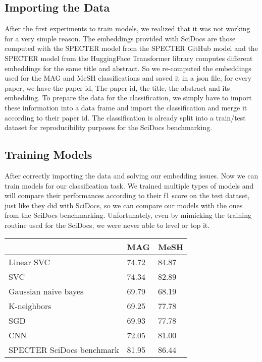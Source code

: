 \documentclass[conference]{IEEEtran}
\begin{document}
\subsection{Importing the Data}

After the first experiments to train models, we realized that it was not working for a very simple reason. The embeddings provided with SciDocs are those computed with the SPECTER model from the SPECTER GitHub model and the SPECTER model from the HuggingFace Transformer library computes different embeddings for the same title and abstract. So we re-computed the embeddings used for the MAG and MeSH classifications and saved it in a json file, for every paper, we have the paper id, The paper id, the title, the abstract and its embedding. To prepare the data for the classification, we simply have to import these information into a data frame and import the classification and merge it according to their paper id. The classification is already split into a train/test dataset for reproducibility purposes for the SciDocs benchmarking.

\subsection{Training Models}

After correctly importing the data and solving our embedding issues. Now we can train models for our classification task. We trained multiple types of models and will compare their performances according to their f1 score on the test dataset, just like they did with SciDocs, so we can compare our models with the ones from the SciDocs benchmarking. Unfortunately, even by mimicking the training routine used for the SciDocs, we were never able to level or top it.

\begin{table}[!h]
\centering
\begin{tabular}{|l|l|l|}
\hline
                          & MAG   & MeSH  \\ \hline
Linear SVC                & 74.72 & 84.87 \\ \hline
SVC                       & 74.34 & 82.89 \\ \hline
Gaussian naive bayes      & 69.79 & 68.19 \\ \hline
K-neighbors               & 69.25 & 77.78 \\ \hline
SGD                       & 69.93 & 77.78 \\ \hline
CNN                       & 72.05 & 81.00 \\ \hline
SPECTER SciDocs benchmark & 81.95 & 86.44 \\ \hline
\end{tabular}
\end{table}
\end{document}
